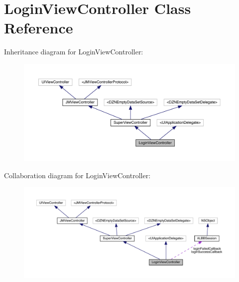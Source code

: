 \hypertarget{interface_login_view_controller}{}\section{Login\+View\+Controller Class Reference}
\label{interface_login_view_controller}


Inheritance diagram for Login\+View\+Controller\+:\nopagebreak
\begin{figure}[H]
\begin{center}
\leavevmode
\includegraphics[width=350pt]{interface_login_view_controller__inherit__graph}
\end{center}
\end{figure}


Collaboration diagram for Login\+View\+Controller\+:\nopagebreak
\begin{figure}[H]
\begin{center}
\leavevmode
\includegraphics[width=350pt]{interface_login_view_controller__coll__graph}
\end{center}
\end{figure}

